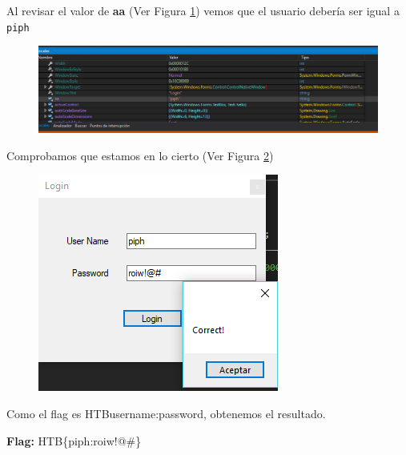 \documentclass[letterpaper,10pt]{article}
\begin{document}
\newpage

Al revisar el valor de \textbf{aa} (Ver Figura \ref{fig:user_p}) vemos que el usuario debería ser igual a \texttt{piph}

\begin{figure}[h]
  \centering
  \includegraphics[scale=0.65]{images/tearordear/user_p}
  \label{fig:user_p}
\end{figure} 

Comprobamos que estamos en lo cierto (Ver Figura \ref{fig:correct})

\begin{figure}[h]
  \centering
  \includegraphics[scale=0.9]{images/tearordear/correct}
  \label{fig:correct}
\end{figure} 

\newpage

Como el flag es HTB{username:password}, obtenemos el resultado.

\textbf{Flag: }HTB\{piph:roiw!$@$\#\}
\end{document}
